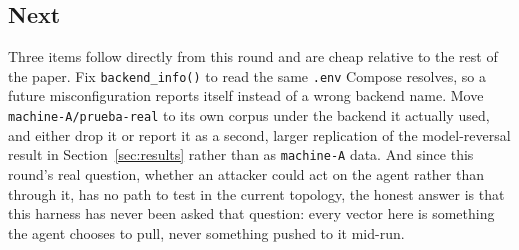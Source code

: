 \subsection{Next}

Three items follow directly from this round and are cheap relative to the
rest of the paper. Fix \texttt{backend\_info()} to read the same
\texttt{.env} Compose resolves, so a future misconfiguration reports itself
instead of a wrong backend name. Move \texttt{machine-A/prueba-real} to its
own corpus under the backend it actually used, and either drop it or report
it as a second, larger replication of the model-reversal result in
Section~\ref{sec:results} rather than as \texttt{machine-A} data. And since
this round's real question, whether an attacker could act on the agent
rather than through it, has no path to test in the current topology, the
honest answer is that this harness has never been asked that question: every
vector here is something the agent chooses to pull, never something pushed
to it mid-run.
